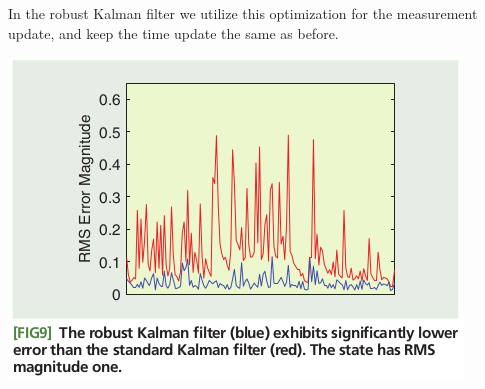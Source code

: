 \documentclass{beamer}
\begin{document}
\begin{frame}

 In the robust Kalman filter we utilize this optimization for the measurement update, and keep the time update the same as before.

\includegraphics[scale=0.7]{performance.png}

\end{frame}
\end{document}
